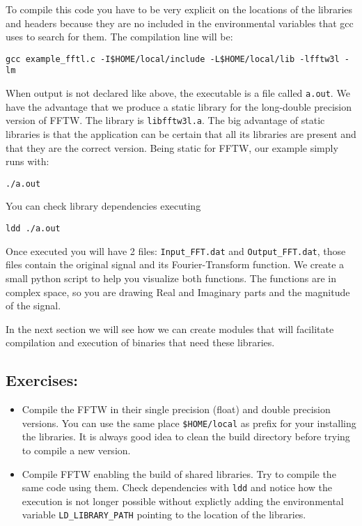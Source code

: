 

To compile this code you have to be very explicit on the locations of the libraries and headers because they are no included in the environmental variables that gcc uses to search for them. The compilation line will be:

\begin{lstlisting}
gcc example_fftl.c -I$HOME/local/include -L$HOME/local/lib -lfftw3l -lm
\end{lstlisting}

When output is not declared like above, the executable is a file called \texttt{a.out}. 
We have the advantage that we produce a static library for the long-double precision version of FFTW. The library is \texttt{libfftw3l.a}. The big advantage of static libraries is that the application can be certain that all its libraries are present and that they are the correct version. Being static for FFTW, our example simply runs with:

\begin{lstlisting}
./a.out
\end{lstlisting}

You can check library dependencies executing

\begin{lstlisting}
ldd ./a.out
\end{lstlisting}

Once executed you will have 2 files: \verb|Input_FFT.dat| 	and	\verb|Output_FFT.dat|, those files contain the original signal and its Fourier-Transform function. We create a small python script to help you visualize both functions. The functions are in complex space, so you are drawing Real and Imaginary parts and the magnitude of the signal.

In the next section we will see how we can create modules that will facilitate compilation and execution of binaries that need these libraries.

\subsection{Exercises:}

\begin{itemize}
\item Compile the FFTW in their single precision (float) and double precision versions. You can use the same place \verb|$HOME/local| as prefix for your installing the libraries. It is always good idea to clean the build directory before trying to compile a new version.

\item Compile FFTW enabling the build of shared libraries.
Try to compile the same code using them. Check dependencies with \texttt{ldd} and notice how the execution is not longer possible without explictly adding the environmental variable \verb|LD_LIBRARY_PATH| pointing to the location of the libraries.

\end{itemize}

